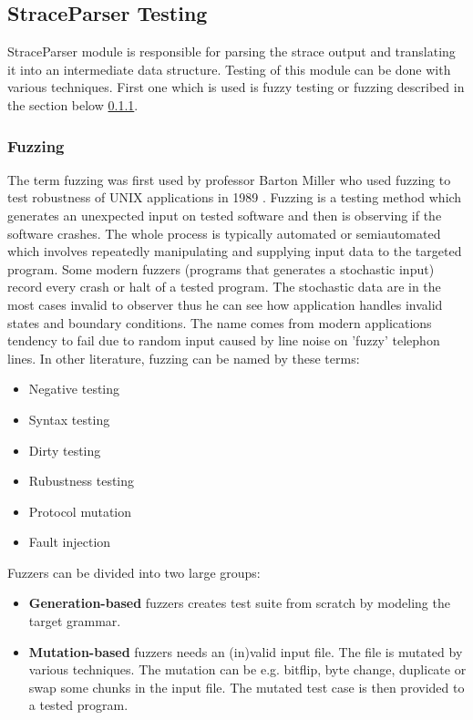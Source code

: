 \subsection{StraceParser Testing}
StraceParser module is responsible for parsing the strace output and translating
it into an intermediate data structure. Testing of this module can be done with
various techniques. First one which is used is fuzzy testing or fuzzing
described in the section below \ref{fuzzing}.

\subsubsection{Fuzzing}
\label{fuzzing}
The term fuzzing was first used by professor Barton Miller who used fuzzing to
test robustness of UNIX applications in 1989 \cite{Takanen:2008:FSS:1404500,
Marhefka2013}. Fuzzing is a testing method which generates an unexpected input
on tested software and then is observing if the software crashes. The whole
process is typically automated or semiautomated which involves repeatedly
manipulating and supplying input data to the targeted program. Some modern
fuzzers (programs that generates a stochastic input) record every crash or halt
of a tested program. The stochastic data are in the most cases invalid to
observer thus he can see how application handles invalid states and boundary
conditions. The name comes from modern applications tendency to fail due to
random input caused by line noise on 'fuzzy' telephon
lines.\cite{Takanen:2008:FSS:1404500, N2LYDLnqzEFYp0wM, takanen2009fuzzing} In
other literature, fuzzing can be named by these terms:
\begin{itemize}
	\item Negative testing
	\item Syntax testing
	\item Dirty testing
	\item Rubustness testing
	\item Protocol mutation
	\item Fault injection
\end{itemize}

\noindent
Fuzzers can be divided into two large groups:

\begin{itemize}
	\item \textbf{Generation-based} fuzzers creates test suite from scratch by modeling the target grammar.
	\item \textbf{Mutation-based} fuzzers needs an (in)valid input file. The file is mutated by various techniques.
	The mutation can be e.g. bitflip, byte change, duplicate or swap some chunks in the input file.
	The mutated test case is then provided to a tested program.
\end{itemize}

